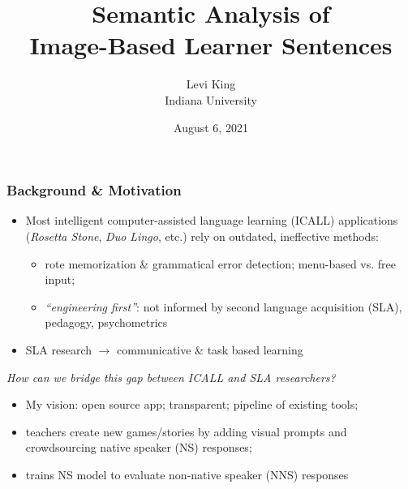 \documentclass[handout,xcolor={dvipsnames}]{beamer}
\title{Semantic Analysis of \\ Image-Based Learner Sentences}
\author[Levi King]{Levi King\\
Indiana University  }
\date{August 6, 2021}
\begin{document}
\maketitle
\begin{frame}
\frametitle{Background \& Motivation}
\begin{itemize}
\pause
\item Most intelligent computer-assisted language learning (ICALL) applications (\textit{Rosetta Stone}, \textit{Duo Lingo}, etc.) rely on outdated, ineffective methods:
\begin{itemize}
\pause
\item rote memorization \& grammatical error detection; menu-based vs. free input;
\pause
\item \textit{``engineering first''}: not informed by second language acquisition (SLA), pedagogy, psychometrics
\end{itemize}
\pause
\item  SLA research $\rightarrow$ communicative \& task based learning
\end{itemize}

\small
\pause
\textit{How can we bridge this gap between ICALL and SLA researchers?}

\begin{itemize}
\pause
\item My vision: \pause open source app; transparent; pipeline of existing tools;
\pause
\item teachers create new games/stories by adding visual prompts and crowdsourcing native speaker (NS) responses;
\pause
\item trains NS model to evaluate non-native speaker (NNS) responses
\end{itemize}
\end{frame}
\end{document}
